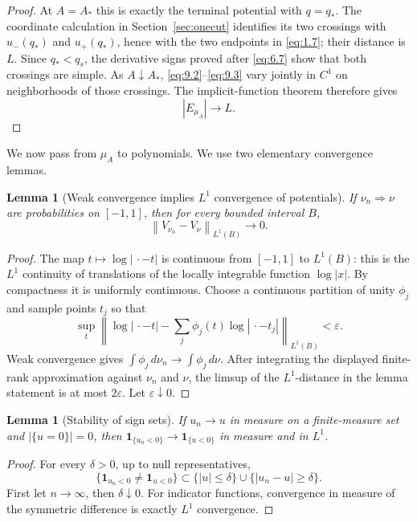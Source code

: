 \documentclass[11pt]{article}
\numberwithin{equation}{section}
\theoremstyle{plain}
\newtheorem{lemma}[theorem]{Lemma}
\theoremstyle{definition}
\theoremstyle{remark}
\newcommand{\1}{\mathbf 1}
\newcommand{\dd}{\,d}
\newcommand{\eps}{\varepsilon}
\newcommand{\norm}[1]{\left\lVert#1\right\rVert}
\begin{document}
\begin{proof}
At $A=A_*$ this is exactly the terminal potential with $q=q_*$.  The
coordinate calculation in Section~\ref{sec:onecut} identifies its two crossings with
$u_-(q_*)$ and $u_+(q_*)$, hence with the two endpoints in \eqref{eq:1.7}; their
distance is $L$.  Since $q_*<q_s$, the derivative signs proved after
\eqref{eq:6.7} show that both crossings are simple.  As $A\downarrow A_*$,
\eqref{eq:9.2}--\eqref{eq:9.3} vary jointly in $C^1$ on neighborhoods of those crossings.
The implicit-function theorem therefore gives
\begin{equation}
 |E_{\mu_A}|\longrightarrow L.
\label{eq:9.4}
\end{equation}
\end{proof}

We now pass from $\mu_A$ to polynomials.  We use two elementary convergence
lemmas.

\begin{lemma}[Weak convergence implies $L^1$ convergence of potentials]
If $\nu_n\Rightarrow\nu$ are probabilities on $[-1,1]$, then for every
bounded interval $B$,
\[
 \norm{V_{\nu_n}-V_\nu}_{L^1(B)}\longrightarrow0.
\]
\end{lemma}

\begin{proof}
The map $t\mapsto\log|\,\cdot-t|$ is continuous from $[-1,1]$ to
$L^1(B)$: this is the $L^1$ continuity of translations of the locally
integrable function $\log|x|$.  By compactness it is uniformly continuous.
Choose a continuous partition of unity $\phi_j$ and sample points $t_j$
so that
\[
 \sup_t\norm{\log|\,\cdot-t|-\sum_j\phi_j(t)
             \log|\,\cdot-t_j|}_{L^1(B)}<\eps.
\]
Weak convergence gives $\int\phi_j\dd\nu_n\to\int\phi_j\dd\nu$.
After integrating the displayed finite-rank approximation against
$\nu_n$ and $\nu$, the limsup of the $L^1$-distance in the lemma statement
is at most $2\eps$.  Let
$\eps\downarrow0$.
\end{proof}

\begin{lemma}[Stability of sign sets]
If $u_n\to u$ in measure on a finite-measure set and $|\{u=0\}|=0$, then
$\1_{\{u_n<0\}}\to\1_{\{u<0\}}$ in measure and in $L^1$.
\end{lemma}

\begin{proof}
For every $\delta>0$, up to null representatives,
\[
 \{\1_{u_n<0}\ne\1_{u<0}\}
 \subset\{|u|\le\delta\}\cup\{|u_n-u|\ge\delta\}.
\]
First let $n\to\infty$, then $\delta\downarrow0$.  For indicator
functions, convergence in measure of the symmetric difference is exactly
$L^1$ convergence.
\end{proof}
\end{document}
